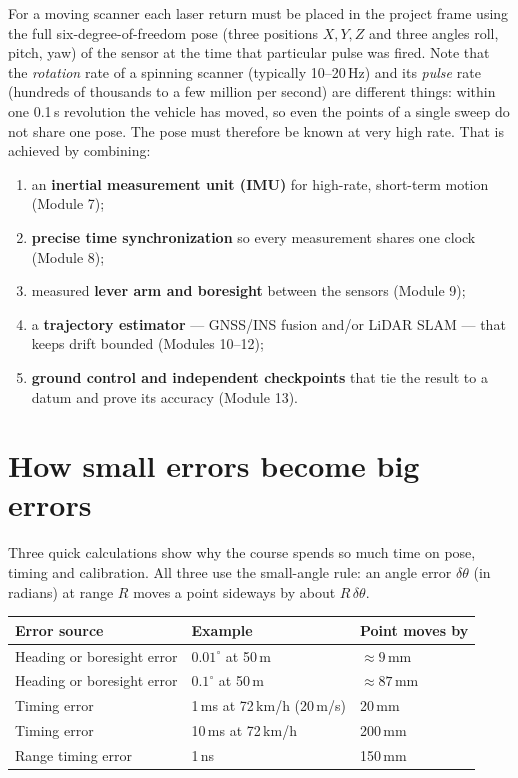\begin{eng}
For a moving scanner each laser return must be placed in the project frame using the full six-degree-of-freedom pose (three positions $X,Y,Z$ and three angles roll, pitch, yaw) of the sensor at the time that particular pulse was fired. Note that the \emph{rotation} rate of a spinning scanner (typically 10--20\,Hz) and its \emph{pulse} rate (hundreds of thousands to a few million per second) are different things: within one 0.1\,s revolution the vehicle has moved, so even the points of a single sweep do not share one pose. The pose must therefore be known at very high rate. That is achieved by combining:
\begin{enumerate}
\item an \textbf{inertial measurement unit (IMU)} for high-rate, short-term motion (Module 7);
\item \textbf{precise time synchronization} so every measurement shares one clock (Module 8);
\item measured \textbf{lever arm and boresight} between the sensors (Module 9);
\item a \textbf{trajectory estimator} --- GNSS/INS fusion and/or LiDAR SLAM --- that keeps drift bounded (Modules 10--12);
\item \textbf{ground control and independent checkpoints} that tie the result to a datum and prove its accuracy (Module 13).
\end{enumerate}
\end{eng}

\section{How small errors become big errors}

Three quick calculations show why the course spends so much time on pose, timing and calibration. All three use the small-angle rule: an angle error $\delta\theta$ (in radians) at range $R$ moves a point sideways by about $R\,\delta\theta$.

\begin{center}\small
\renewcommand{\arraystretch}{1.2}
\begin{tabularx}{\linewidth}{Xll}
\toprule
\textbf{Error source} & \textbf{Example} & \textbf{Point moves by}\\ \midrule
Heading or boresight error & $0.01^\circ$ at 50\,m & $\approx 9$\,mm\\
Heading or boresight error & $0.1^\circ$ at 50\,m & $\approx 87$\,mm\\
Timing error & 1\,ms at 72\,km/h (20\,m/s) & 20\,mm\\
Timing error & 10\,ms at 72\,km/h & 200\,mm\\
Range timing error & 1\,ns & 150\,mm\\
\bottomrule
\end{tabularx}
\end{center}

